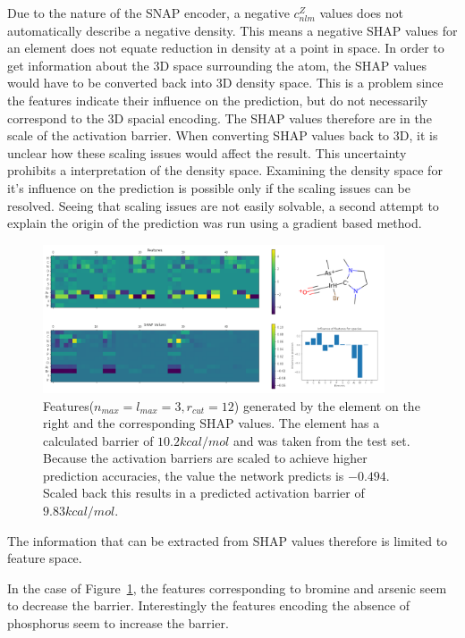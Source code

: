 Due to the nature of the SNAP encoder, a negative $c_{nlm}^Z$ values does not automatically 
describe a negative density.
This means a negative SHAP values for an element does not equate reduction in density
at a point in space.
In order to get information about the 3D space surrounding the atom, the SHAP values would have to be converted back into 3D density space.
This is a problem since the features indicate their influence on the prediction, but do not necessarily correspond 
to the 3D spacial encoding.
The SHAP values therefore are in the scale of the activation barrier.
When converting SHAP values back to 3D, it is unclear how these scaling issues would 
affect the result. 
This uncertainty prohibits a interpretation of the density space.
Examining the density space for it's influence on the prediction is possible only if the scaling
issues can be resolved.
Seeing that scaling issues are not easily solvable, a second attempt to explain the origin of the prediction
was run using a gradient based method.

\begin{figure}[H]
    \centering
    \includegraphics[width=0.9\textwidth]{figures/evaluation/SHAP.png}
    \caption[SHAP values]{
        Features($n_{max}=l_{max}=3, r_{cut}=12$) generated by the element on the right and the corresponding SHAP values.
        The element has a calculated barrier of $10.2 kcal/mol$ and was taken from the test set.
        Because the activation barriers are scaled to achieve higher prediction accuracies,
        the value the network predicts is $-0.494$. Scaled back this results in a predicted activation 
        barrier of $9.83 kcal/mol$.
     }
    \label{fig:shap}
  \end{figure}

The information that can be extracted from SHAP values therefore is limited to feature space.

In the case of Figure~\ref{fig:shap}, the features corresponding to bromine and arsenic seem to decrease the barrier.
Interestingly the features encoding the absence of phosphorus seem to increase the barrier.

